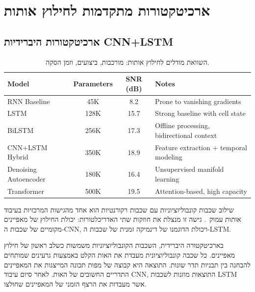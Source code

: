 \chapter{ארכיטקטורות מתקדמות לחילוץ אותות}

\section{ארכיטקטורות היברידיות CNN+LSTM}

\begin{table}[htbp]
\centering
\caption{השוואת מודלים לחילוץ אותות: מורכבות, ביצועים, וזמן הסקה.}
\label{tab:model_comparison}
\begin{LTR}
\begin{tabular}{|l|c|c|p{4cm}|}
\hline
\textbf{Model} & \textbf{Parameters} & \textbf{SNR (dB)} & \textbf{Notes} \\
\hline
\textenglish{RNN Baseline} & 45K & 8.2 & Prone to vanishing gradients \\
\hline
\textenglish{LSTM} & 128K & 15.7 & Strong baseline with cell state \\
\hline
\textenglish{BiLSTM} & 256K & 17.3 & Offline processing, bidirectional context \\
\hline
\textenglish{CNN+LSTM Hybrid} & 350K & 18.9 & Feature extraction + temporal modeling \\
\hline
\textenglish{Denoising Autoencoder} & 180K & 16.4 & Unsupervised manifold learning \\
\hline
\textenglish{Transformer} & 500K & 19.5 & Attention-based, high capacity \\
\hline
\end{tabular}
\end{LTR}
\end{table}

שילוב שכבות קונבוליוציוניות עם שכבות רקורנטיות הוא אחד מהגישות המרכזיות בעיבוד אותות עמוק~\cite{wang2023survey_agents}. גישה זו מנצלת את חוזקות שתי האדריכלטורות: יכולת החילוץ של מאפיינים מקומיים של שכבות ה-\textenglish{CNN}, ויכולת הדוגמנו של דינמיקה זמנית של שכבות ה-\textenglish{LSTM}.

בארכיטקטורה היברידית, השכבות הקונבוליוציוניות משמשות כשלב ראשון של חילוץ מאפיינים. כל שכבה קונבוליוציונית מעבדת את האות הקלט באמצעות גרעינים שמותחים להבחנה בין תבניות תדר שונות. התוצאה היא קבוצה של מפות תכונה המייצגות את המאפיינים התדריים החשובים של האות. לאחר סיום עיבוד \textenglish{CNN}, התוצאות מוזנות לשכבות \textenglish{LSTM} אשר מעבדות את הרצף הזמני של המאפיינים שחולצו.

